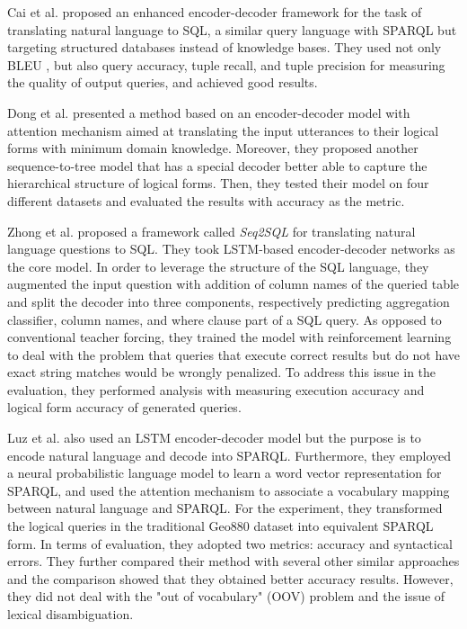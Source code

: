 Cai et al. \cite{Cai2017} proposed an enhanced encoder-decoder framework for the task of translating natural language to SQL, a similar query language with SPARQL but targeting structured databases instead of knowledge bases. They used not only BLEU \cite{Papineni2002}, but also query accuracy, tuple recall, and tuple precision for measuring the quality of output queries, and achieved good results.

Dong et al. \cite{dong2016language} presented a method based on an encoder-decoder model with attention mechanism aimed at translating the input utterances to their logical forms with minimum domain knowledge. Moreover, they proposed another sequence-to-tree model that has a special decoder better able to capture the hierarchical structure of logical forms. Then, they tested their model on four different datasets and evaluated the results with accuracy as the metric.

Zhong et al. \cite{DBLP:journals/corr/abs-1709-00103} proposed a framework called \textit{Seq2SQL} for translating natural language questions to SQL. They took LSTM-based encoder-decoder networks as the core model. In order to leverage the structure of the SQL language, they augmented the input question with addition of column names of the queried table and split the decoder into three components, respectively predicting aggregation classifier, column names, and where clause part of a SQL query. As opposed to conventional teacher forcing, they trained the model with reinforcement learning to deal with the problem that queries that execute correct results but do not have exact string matches would be wrongly penalized. To address this issue in the evaluation, they performed analysis with measuring execution accuracy and logical form accuracy of generated queries.

Luz et al. \cite{Luz2018} also used an LSTM encoder-decoder model but the purpose is to encode natural language and decode into SPARQL. Furthermore, they employed a neural probabilistic language model to learn a word vector representation for SPARQL, and used the attention mechanism to associate a vocabulary mapping between natural language and SPARQL. For the experiment, they transformed the logical queries in the traditional Geo880 dataset into equivalent SPARQL form. In terms of evaluation, they adopted two metrics: accuracy and syntactical errors. They further compared their method with several other similar approaches \cite{alagha2015using,Kaufmann06querix:a} and the comparison showed that they obtained better accuracy results. However, they did not deal with the "out of vocabulary" (OOV) problem and the issue of lexical disambiguation.

